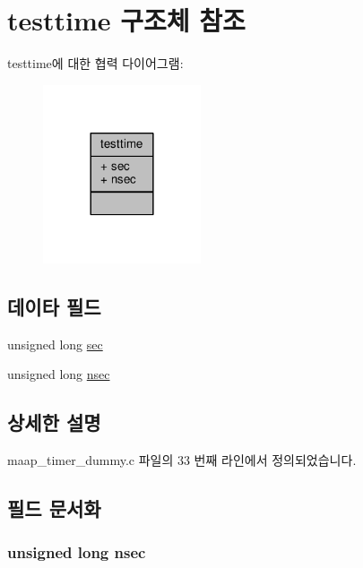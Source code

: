 \hypertarget{structtesttime}{}\section{testtime 구조체 참조}
\label{structtesttime}


testtime에 대한 협력 다이어그램\+:
\nopagebreak
\begin{figure}[H]
\begin{center}
\leavevmode
\includegraphics[width=132pt]{structtesttime__coll__graph}
\end{center}
\end{figure}
\subsection*{데이타 필드}
\begin{DoxyCompactItemize}
\item 
unsigned long \hyperlink{structtesttime_ae2b5b8923256b96d926940d616058907}{sec}
\item 
unsigned long \hyperlink{structtesttime_a18b4d370d8bd012696eafc0d5ffb22f3}{nsec}
\end{DoxyCompactItemize}


\subsection{상세한 설명}


maap\+\_\+timer\+\_\+dummy.\+c 파일의 33 번째 라인에서 정의되었습니다.



\subsection{필드 문서화}
\subsubsection[{\texorpdfstring{nsec}{nsec}}]{\setlength{\rightskip}{0pt plus 5cm}unsigned long nsec}\hypertarget{structtesttime_a18b4d370d8bd012696eafc0d5ffb22f3}{}\label{structtesttime_a18b4d370d8bd012696eafc0d5ffb22f3}


